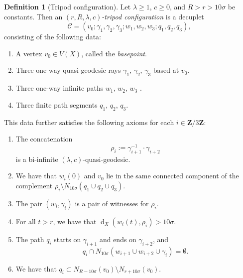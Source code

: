 \documentclass[11pt,a4paper]{amsart}
\DeclareMathOperator{\dist}{d}
\newcommand{\Z}{\mathbf{Z}}
\theoremstyle{definition}
\newtheorem{definition}[theorem]{Definition}
\newcommand{\crosshair}{\mathcal{C}}
\begin{document}
\begin{definition}[Tripod configuration]
    Let $\lambda \geq 1$, $c \geq 0$, and $R> r > 10\sigma$ be constants. Then an \emph{$(r, R, \lambda, c)$-tripod configuration} is a decuplet 
    $$
    \crosshair = (v_0;\gamma_1, \gamma_2,\gamma_3;w_1,w_2,w_3;q_1,q_2,q_3), 
    $$
    consisting of the following data:
    \begin{enumerate}
        \item A vertex $v_0 \in V(X)$, called the \emph{basepoint}.

        \item Three one-way quasi-geodesic rays $\gamma_1$, $\gamma_2$, $\gamma_3$ based at $v_0$.

        \item Three one-way infinite paths $w_1$, $w_2$, $w_3$ . 

        \item Three finite path segments $q_1$, $q_2$, $q_3$.
    \end{enumerate}
    This data further satisfies the following axioms for each $i \in \Z/3\Z$:
    \begin{enumerate}
        \item[(TC1)]\label{itm:ce1} The concatenation 
        $$
        \rho_{i} := \gamma_{i+1}^{-1} \cdot \gamma_{i+2}
        $$
        is a bi-infinite $(\lambda,c)$-quasi-geodesic.

        \item[(TC2)]\label{ce2} We have that $w_i(0)$ and $v_0$ lie in the same connected component of the complement $\rho_i \setminus N_{10\sigma}(q_1 \cup q_2 \cup q_3)$. 

        \item[(TC3)]\label{ce3} The pair $(w_i, \gamma_i)$ is a pair of witnesses for $\rho_i$.

        \item[(TC4)]\label{ce4} For all $t > r$, we have that $\dist_X(w_i(t), \rho_i) > 10\sigma$. 

        \item[(TC5)]\label{ce5} The path $q_i$ starts on $\gamma_{i+1}$ and ends on $\gamma_{i+2}$, and 
        $$
        q_i \cap N_{10\sigma}(w_{i+1} \cup w_{i+2} \cup \gamma_i) = \emptyset.
        $$

        \item[(TC6)]\label{ce6} We have that  $q_i \subset N_{R-10\sigma}(v_0) \setminus N_{r+10\sigma}(v_0)$. 

    \end{enumerate}
    
\end{definition}
\end{document}
